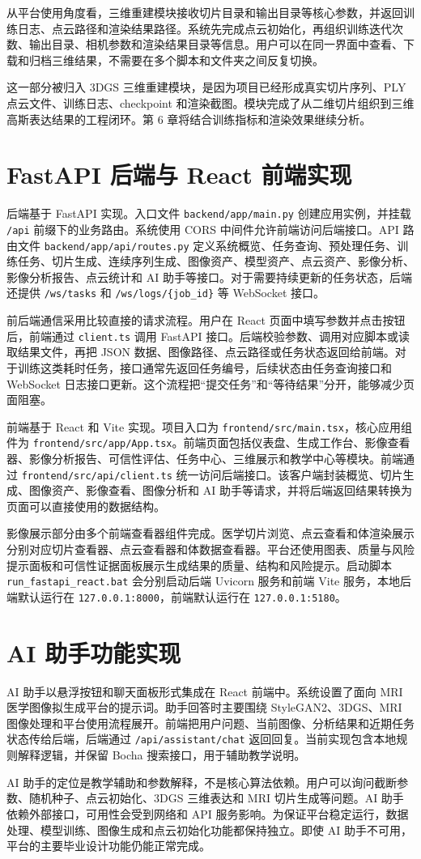 从平台使用角度看，三维重建模块接收切片目录和输出目录等核心参数，并返回训练日志、点云路径和渲染结果路径。系统先完成点云初始化，再组织训练迭代次数、输出目录、相机参数和渲染结果目录等信息。用户可以在同一界面中查看、下载和归档三维结果，不需要在多个脚本和文件夹之间反复切换。

这一部分被归入 3DGS 三维重建模块，是因为项目已经形成真实切片序列、PLY 点云文件、训练日志、checkpoint 和渲染截图。模块完成了从二维切片组织到三维高斯表达结果的工程闭环。第 6 章将结合训练指标和渲染效果继续分析。

\section{FastAPI 后端与 React 前端实现}
后端基于 FastAPI 实现。入口文件 \texttt{backend/app/main.py} 创建应用实例，并挂载 \texttt{/api} 前缀下的业务路由。系统使用 CORS 中间件允许前端访问后端接口。API 路由文件 \texttt{backend/app/api/routes.py} 定义系统概览、任务查询、预处理任务、训练任务、切片生成、连续序列生成、图像资产、模型资产、点云资产、影像分析、影像分析报告、点云统计和 AI 助手等接口。对于需要持续更新的任务状态，后端还提供 \texttt{/ws/tasks} 和 \texttt{/ws/logs/\{job\_id\}} 等 WebSocket 接口。

前后端通信采用比较直接的请求流程。用户在 React 页面中填写参数并点击按钮后，前端通过 \texttt{client.ts} 调用 FastAPI 接口。后端校验参数、调用对应脚本或读取结果文件，再把 JSON 数据、图像路径、点云路径或任务状态返回给前端。对于训练这类耗时任务，接口通常先返回任务编号，后续状态由任务查询接口和 WebSocket 日志接口更新。这个流程把“提交任务”和“等待结果”分开，能够减少页面阻塞。

前端基于 React 和 Vite 实现。项目入口为 \texttt{frontend/src/main.tsx}，核心应用组件为 \texttt{frontend/src/app/App.tsx}。前端页面包括仪表盘、生成工作台、影像查看器、影像分析报告、可信性评估、任务中心、三维展示和教学中心等模块。前端通过 \texttt{frontend/src/api/client.ts} 统一访问后端接口。该客户端封装概览、切片生成、图像资产、影像查看、图像分析和 AI 助手等请求，并将后端返回结果转换为页面可以直接使用的数据结构。

影像展示部分由多个前端查看器组件完成。医学切片浏览、点云查看和体渲染展示分别对应切片查看器、点云查看器和体数据查看器。平台还使用图表、质量与风险提示面板和可信性证据面板展示生成结果的质量、结构和风险提示。启动脚本 \texttt{run\_fastapi\_react.bat} 会分别启动后端 Uvicorn 服务和前端 Vite 服务，本地后端默认运行在 \texttt{127.0.0.1:8000}，前端默认运行在 \texttt{127.0.0.1:5180}。

\section{AI 助手功能实现}
AI 助手以悬浮按钮和聊天面板形式集成在 React 前端中。系统设置了面向 MRI 医学图像拟生成平台的提示词。助手回答时主要围绕 StyleGAN2、3DGS、MRI 图像处理和平台使用流程展开。前端把用户问题、当前图像、分析结果和近期任务状态传给后端，后端通过 \texttt{/api/assistant/chat} 返回回复。当前实现包含本地规则解释逻辑，并保留 Bocha 搜索接口，用于辅助教学说明。

AI 助手的定位是教学辅助和参数解释，不是核心算法依赖。用户可以询问截断参数、随机种子、点云初始化、3DGS 三维表达和 MRI 切片生成等问题。AI 助手依赖外部接口，可用性会受到网络和 API 服务影响。为保证平台稳定运行，数据处理、模型训练、图像生成和点云初始化功能都保持独立。即使 AI 助手不可用，平台的主要毕业设计功能仍能正常完成。
